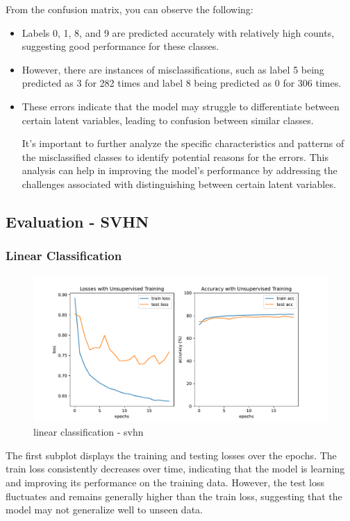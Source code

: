 \documentclass{midl} %
\begin{document}
From the confusion matrix, you can observe the following:
\begin{itemize}
  \item Labels 0, 1, 8, and 9 are predicted accurately with relatively high counts, suggesting good performance for these classes.
  \item However, there are instances of misclassifications, such as label 5 being predicted as 3 for 282 times and label 8 being predicted as 0 for 306 times.
  \item These errors indicate that the model may struggle to differentiate between certain latent variables, leading to confusion between similar classes.
  
It's important to further analyze the specific characteristics and patterns of the misclassified classes to identify potential reasons for the errors. This analysis can help in improving the model's performance by addressing the challenges associated with distinguishing between certain latent variables.
\end{itemize}

\subsection{Evaluation - SVHN}
\subsubsection{Linear Classification}
\begin{figure}[H]
  \centering
  \includegraphics[width=1.2\textwidth]{linear_classif_svhn.pdf}
  \caption{linear classification - svhn}
  \label{fig:linear classification - svhn}
\end{figure}
The first subplot displays the training and testing losses over the epochs. The train loss consistently decreases over time, indicating that the model is learning and improving its performance on the training data. However, the test loss fluctuates and remains generally higher than the train loss, suggesting that the model may not generalize well to unseen data.
\end{document}
